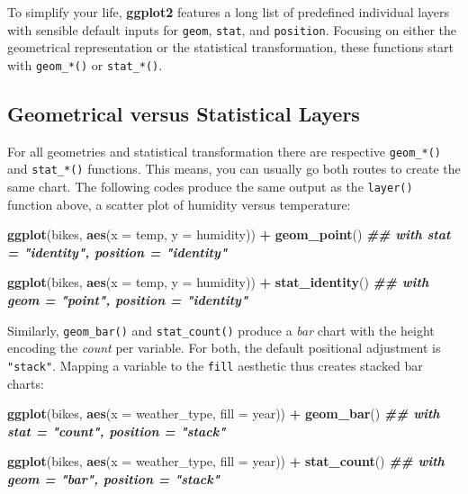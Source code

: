 \documentclass[
]{krantz}
\makeatletter
\newenvironment{Shaded}{\begin{snugshade}}{\end{snugshade}}
\newcommand{\AttributeTok}[1]{\textcolor[rgb]{0.27,0.27,0.27}{#1}}
\newcommand{\DocumentationTok}[1]{\textcolor[rgb]{0.37,0.37,0.37}{\textbf{\textit{#1}}}}
\newcommand{\FunctionTok}[1]{\textcolor[rgb]{0.27,0.27,0.27}{\textbf{#1}}}
\newcommand{\NormalTok}[1]{#1}
\newcommand{\SpecialCharTok}[1]{\textcolor[rgb]{0.43,0.43,0.43}{\textbf{#1}}}
\newenvironment{kframe}{%
\medskip{}
\setlength{\fboxsep}{.8em}
 \def\at@end@of@kframe{}%
 \ifinner\ifhmode%
  \def\at@end@of@kframe{\end{minipage}}%
  \begin{minipage}{\columnwidth}%
 \fi\fi%
 \def\FrameCommand##1{\hskip\@totalleftmargin \hskip-\fboxsep
 \colorbox{shadecolor}{##1}\hskip-\fboxsep
     \hskip-\linewidth \hskip-\@totalleftmargin \hskip\columnwidth}%
 \MakeFramed {\advance\hsize-\width
   \@totalleftmargin\z@ \linewidth\hsize
   \@setminipage}}%
 {\par\unskip\endMakeFramed%
 \at@end@of@kframe}
\renewenvironment{Shaded}{\begin{kframe}}{\end{kframe}}
\makeatother
\begin{document}
To simplify your life, \textbf{ggplot2} features a long list of predefined individual layers with sensible default inputs for \texttt{geom}, \texttt{stat}, and \texttt{position}. Focusing on either the geometrical representation or the statistical transformation, these functions start with \texttt{geom\_*()} or \texttt{stat\_*()}.

\hypertarget{geometrical-versus-statistical-layers}{%
\subsection{Geometrical versus Statistical Layers}\label{geometrical-versus-statistical-layers}}

For all geometries and statistical transformation there are respective \texttt{geom\_*()} and \texttt{stat\_*()} functions. This means, you can usually go both routes to create the same chart. The following codes produce the same output as the \texttt{layer()} function above, a scatter plot of humidity versus temperature:

\begin{Shaded}
\begin{Highlighting}[]
\FunctionTok{ggplot}\NormalTok{(bikes, }\FunctionTok{aes}\NormalTok{(}\AttributeTok{x =}\NormalTok{ temp, }\AttributeTok{y =}\NormalTok{ humidity)) }\SpecialCharTok{+}
  \FunctionTok{geom\_point}\NormalTok{() }\DocumentationTok{\#\# with \textasciigrave{}stat = "identity", position = "identity"\textasciigrave{}}

\FunctionTok{ggplot}\NormalTok{(bikes, }\FunctionTok{aes}\NormalTok{(}\AttributeTok{x =}\NormalTok{ temp, }\AttributeTok{y =}\NormalTok{ humidity)) }\SpecialCharTok{+}
  \FunctionTok{stat\_identity}\NormalTok{() }\DocumentationTok{\#\# with \textasciigrave{}geom = "point", position = "identity"\textasciigrave{}}
\end{Highlighting}
\end{Shaded}

Similarly, \texttt{geom\_bar()} and \texttt{stat\_count()} produce a \emph{bar} chart with the height encoding the \emph{count} per variable. For both, the default positional adjustment is \texttt{"stack"}. Mapping a variable to the \texttt{fill} aesthetic thus creates stacked bar charts:

\begin{Shaded}
\begin{Highlighting}[]
\FunctionTok{ggplot}\NormalTok{(bikes, }\FunctionTok{aes}\NormalTok{(}\AttributeTok{x =}\NormalTok{ weather\_type, }\AttributeTok{fill =}\NormalTok{ year)) }\SpecialCharTok{+} 
  \FunctionTok{geom\_bar}\NormalTok{() }\DocumentationTok{\#\# with \textasciigrave{}stat = "count", position = "stack"\textasciigrave{}}

\FunctionTok{ggplot}\NormalTok{(bikes, }\FunctionTok{aes}\NormalTok{(}\AttributeTok{x =}\NormalTok{ weather\_type, }\AttributeTok{fill =}\NormalTok{ year)) }\SpecialCharTok{+} 
  \FunctionTok{stat\_count}\NormalTok{() }\DocumentationTok{\#\# with \textasciigrave{}geom = "bar", position = "stack"\textasciigrave{}}
\end{Highlighting}
\end{Shaded}
\end{document}
